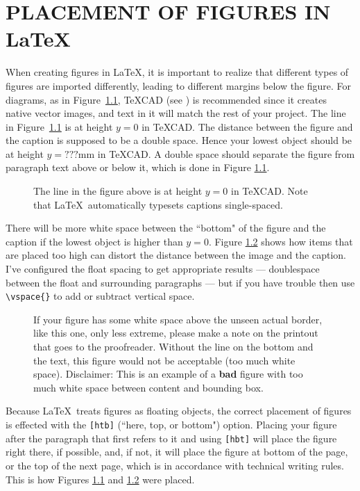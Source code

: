 \chapter{PLACEMENT OF FIGURES IN \LaTeX }\label{chap2:body1}


When creating figures in \LaTeX, it is important to realize that
different types of figures are imported differently, leading to
different margins below the figure.
For diagrams, as in Figure~\ref{pg1},
\TeX CAD (see \cite{texcad}) is recommended since it creates
native vector images, and text in it will match the rest of your project.
The line in Figure~\ref{pg1} is at height $y=0$ in \TeX CAD.
The distance between the figure and the caption is supposed to be
a double space.
Hence your lowest object should be at height $y=???$mm in \TeX CAD.
A double space should separate the figure from paragraph text
above or below it, which is done in Figure \ref{pg1}.

\begin{figure}[htb]
	\centering
	
	\caption{
	The line in the figure above is at height $y=0$ in \TeX CAD.
	Note that \LaTeX \ automatically typesets captions single-spaced.
	}
	\label{pg1}
\end{figure}

There will be more white space between the ``bottom" of the figure and
the caption if the lowest object is higher than $y=0$.
Figure \ref{pg3} shows how items that are placed too high can
distort the distance between the image and the caption.
I've configured the float spacing to get appropriate results
--- doublespace between the float and surrounding paragraphs --- but
if you have trouble then use \verb+\vspace{}+ to add or subtract
vertical space.

\begin{figure}[htb]
	\centering
	
	\caption{If your figure has some white space above the unseen actual border,
	like this one, only less extreme, please make a note on the printout that
	goes to the proofreader. Without the line on the bottom and the text,
	this figure would not be acceptable (too much white space).
	Disclaimer: This is an example of a {\bf bad} figure with too much
	white space between content and bounding box.}
	\label{pg3}
\end{figure}



Because \LaTeX \ treats figures as floating objects,
the correct placement of figures is effected with the
\verb+[htb]+ (``here, top, or bottom") option.
Placing your figure after the paragraph that first refers to it
and using \verb+[hbt]+ will place the figure right there, if possible, and,
if not, it will place the figure at bottom of the page, or
the top of the next page,
which is in accordance with technical writing rules.
This is how Figures \ref{pg1} and \ref{pg3} were placed.

